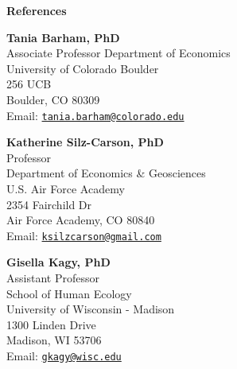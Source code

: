 \documentclass[letterpaper]{article}
\begin{document}
  \begin{center}
	\textbf{References}

\begin{minipage}{0.45\linewidth}
	\textbf{Tania Barham, PhD} \\
  Associate Professor
	Department of Economics \\
	University of Colorado Boulder \\
	256 UCB \\
	Boulder, CO 80309 \\
	Email: \href{mailto:tania.barham@colorado.edu}{\tt tania.barham@colorado.edu} \\
\end{minipage}
\begin{minipage}{.1\linewidth}
\end{minipage}
\begin{minipage}{0.45\linewidth}
	\textbf{Katherine Silz-Carson, PhD} \\
	Professor \\
Department of Economics & Geosciences \\
U.S. Air Force Academy \\ 
2354 Fairchild Dr \\
Air Force Academy, CO 80840 \\
Email: \href{mailto:tania.barham@colorado.edu}{\tt ksilzcarson@gmail.com} \\
\end{minipage} 

\begin{minipage}{0.45\linewidth}
	\textbf{Gisella Kagy, PhD } \\
	Assistant Professor \\
School of Human Ecology \\
University of Wisconsin - Madison \\
1300 Linden Drive \\
Madison, WI 53706 \\
Email: \href{mailto:tania.barham@colorado.edu}{\tt gkagy@wisc.edu} \\
\end{minipage}
\begin{minipage}{.1\linewidth}
\end{minipage}
\begin{minipage}{0.45\linewidth}
	\hspace*{.5\linewidth}
\end{minipage}
\end{center}
\end{document}
